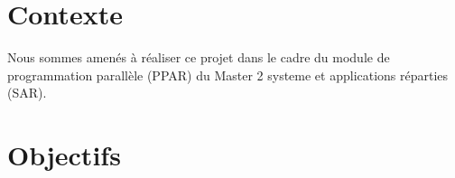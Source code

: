 \section{Contexte}
\par Nous sommes amenés à réaliser ce projet dans
le cadre du module de programmation parallèle (PPAR) du
Master 2 systeme et applications réparties (SAR).


\section{Objectifs}